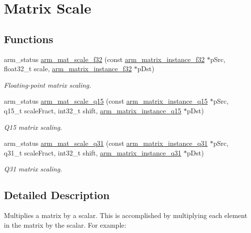 \hypertarget{group___matrix_scale}{\section{Matrix Scale}
\label{group___matrix_scale}
}
\subsection*{Functions}
\begin{DoxyCompactItemize}
\item 
arm\-\_\-status \hyperlink{group___matrix_scale_ga9cb4e385b18c9a0b9cbc940c1067ca12}{arm\-\_\-mat\-\_\-scale\-\_\-f32} (const \hyperlink{structarm__matrix__instance__f32}{arm\-\_\-matrix\-\_\-instance\-\_\-f32} $\ast$p\-Src, float32\-\_\-t scale, \hyperlink{structarm__matrix__instance__f32}{arm\-\_\-matrix\-\_\-instance\-\_\-f32} $\ast$p\-Dst)
\begin{DoxyCompactList}\small\item\em Floating-\/point matrix scaling. \end{DoxyCompactList}\item 
arm\-\_\-status \hyperlink{group___matrix_scale_ga7521769e2cf1c3d9c4656138cd2ae2ca}{arm\-\_\-mat\-\_\-scale\-\_\-q15} (const \hyperlink{structarm__matrix__instance__q15}{arm\-\_\-matrix\-\_\-instance\-\_\-q15} $\ast$p\-Src, q15\-\_\-t scale\-Fract, int32\-\_\-t shift, \hyperlink{structarm__matrix__instance__q15}{arm\-\_\-matrix\-\_\-instance\-\_\-q15} $\ast$p\-Dst)
\begin{DoxyCompactList}\small\item\em Q15 matrix scaling. \end{DoxyCompactList}\item 
arm\-\_\-status \hyperlink{group___matrix_scale_ga609743821ee81fa8c34c4bcdc1ed9744}{arm\-\_\-mat\-\_\-scale\-\_\-q31} (const \hyperlink{structarm__matrix__instance__q31}{arm\-\_\-matrix\-\_\-instance\-\_\-q31} $\ast$p\-Src, q31\-\_\-t scale\-Fract, int32\-\_\-t shift, \hyperlink{structarm__matrix__instance__q31}{arm\-\_\-matrix\-\_\-instance\-\_\-q31} $\ast$p\-Dst)
\begin{DoxyCompactList}\small\item\em Q31 matrix scaling. \end{DoxyCompactList}\end{DoxyCompactItemize}


\subsection{Detailed Description}
Multiplies a matrix by a scalar. This is accomplished by multiplying each element in the matrix by the scalar. For example\-: 

